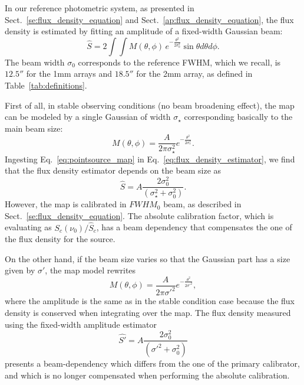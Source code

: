In our reference photometric system, as presented in
Sect.~\ref{se:flux_density_equation} and
Sect.~\ref{ap:flux_density_equation},
the flux density is estimated by fitting an amplitude of a fixed-width
Gaussian beam:
\begin{equation}
  \hat{S}  = 2 \int \int M(\theta, \phi)\, e^{-\frac{\theta^{2}}{2\sigma_{0}^{2}}} \sin \theta d\theta d\phi.
  \label{eq:flux_density_estimator}
\end{equation}
The beam width $\sigma_{0}$ corresponds to the
reference FWHM, which we recall,  is $12.5''$ for the 1mm arrays and $18.5''$ for
the 2mm array, as defined in Table~\ref{tab:definitions}.

First of all, in stable observing conditions (no beam
broadening effect), the map can be modeled by a single Gaussian of
width $\sigma_\star$ corresponding basically to the main beam size:
\begin{equation}
  M(\theta, \phi) = \frac{A}{2 \pi \sigma_\star^{2}} e^{-\frac{\theta^{2}}{2\sigma_\star^{2}}}.
  \label{eq:pointsource_map}
\end{equation}
Ingesting Eq.~\ref{eq:pointsource_map} in
Eq.~\ref{eq:flux_density_estimator}, we find that the flux density
estimator depends on the beam size as
\begin{equation}
  \hat{S}  = A \frac{2 \sigma_0^2}{(\sigma_{\star}^2 + \sigma_0^2)}.
\end{equation}
However, the map is calibrated in $FWHM_0$ beam, as described in
Sect.~\ref{se:flux_density_equation}. The absolute calibration factor,
which is evaluating as
$S_{c}(\nu_{0})/\hat{S}_{c}$, has a beam dependency that
compensates the one of the flux density for the source.

On the other hand, if the beam size varies so that the Gaussian part has a size given by
$\sigma'$, the map model rewrites  
\begin{equation}
  M(\theta, \phi) = \frac{A}{2 \pi \sigma'^{2}} e^{-\frac{\theta^{2}}{2\sigma'^{2}}},
  \label{eq:broader_beam_map}
\end{equation}
where the amplitude is the same as in the stable condition case
because the flux density is conserved when integrating over the map. 
The flux density measured using the fixed-width amplitude estimator 
\begin{equation}
  \hat{S'}  = A \frac{2 \sigma_0^2}{(\sigma'^2 + \sigma_0^2)}
\end{equation}
presents a beam-dependency which differs from the one of the primary
calibrator, and which is no longer compensated when performing the
absolute calibration.

